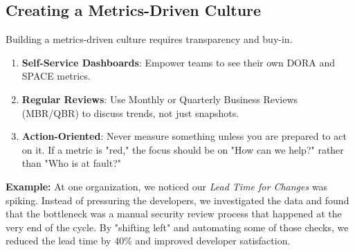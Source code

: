 \subsection{Creating a Metrics-Driven Culture}
Building a metrics-driven culture requires transparency and buy-in.
\begin{enumerate}
    \item \textbf{Self-Service Dashboards}: Empower teams to see their own DORA and SPACE metrics.
    \item \textbf{Regular Reviews}: Use Monthly or Quarterly Business Reviews (MBR/QBR) to discuss trends, not just snapshots.
    \item \textbf{Action-Oriented}: Never measure something unless you are prepared to act on it. If a metric is "red," the focus should be on "How can we help?" rather than "Who is at fault?"
\end{enumerate}

\textbf{Example:} At one organization, we noticed our \textit{Lead Time for Changes} was spiking. Instead of pressuring the developers, we investigated the data and found that the bottleneck was a manual security review process that happened at the very end of the cycle. By "shifting left" and automating some of those checks, we reduced the lead time by 40\% and improved developer satisfaction.

